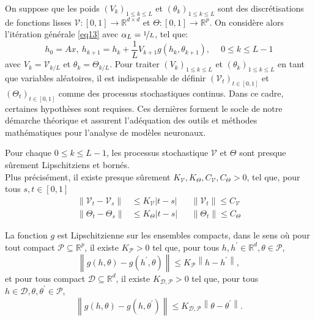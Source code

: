 On suppose que les poids $(V_k)_{1\leqslant k \leqslant L }$ et $(\theta_k)_{1\leqslant k \leqslant L }$ sont des discrétisations de fonctions lisses $\mathscr{V}:[0,1] \to \mathbb{R}^{d \times d}$ et $\Theta:[0,1] \to \mathbb{R}^{p}$. On considère alors l'itération générale \ref*{eq13} avec $\alpha_L = \nicefrac{1}{L}$, tel que:
\begin{equation}\label{eq13}
    h_0 = Ax,\ h_{k+1} = h_k + \frac{1}{L}V_{k+1}g(h_k,\theta_{k+1}),\quad \ 0 \leqslant k \leqslant L-1
\end{equation}
avec $V_k = \mathscr{V}_{k/L}$ et $\theta_k = \Theta_{k/L}$.
Pour traiter $(V_k)_{1\leqslant k \leqslant L}$ et $(\theta_k)_{1\leqslant k \leqslant L}$ en tant que variables aléatoires, il est indispensable de définir $(\mathscr{V}_t)_{t \in [0,1]}$ et $(\Theta_t)_{t \in [0,1]}$ comme des processus stochastiques continus. Dans ce cadre, certaines hypothèses sont requises. Ces dernières forment le socle de notre démarche théorique et assurent l'adéquation des outils et méthodes mathématiques pour l'analyse de modèles neuronaux.

\begin{assumption}\label{H5}
    Pour chaque $0 \leqslant k \leqslant L-1$, les processus stochastique $\mathscr{V}$ et $\Theta$ sont presque sûrement Lipschitziens et bornés. \\
    Plus précisément, il existe presque sûrement $K_{\mathscr{V}}, K_{\Theta}, C_{\mathscr{V}}, C_{\Theta}>0$, tel que, pour tous $s, t \in [0,1]$
    \begin{align*}
        \left\|\mathscr{V}_t-\mathscr{V}_s\right\| &\leqslant K_{\mathscr{V}}|t-s| 
        &&\left\|\mathscr{V}_t\right\| \leqslant C_{\mathscr{V}} \\
        \left\|\Theta_t-\Theta_s\right\| &\leqslant K_{\Theta}|t-s| 
        &&\left\|\Theta_t\right\| \leqslant C_{\Theta}
    \end{align*}
\end{assumption}

\begin{assumption}\label{H6}
La fonction $g$ est Lipschitzienne sur les ensembles compacts, dans le sens où pour tout compact $\mathscr{P} \subseteq \mathbb{R}^p$, il existe $K_{\mathscr{P}} > 0$  tel que, pour tous $h, h^{\prime} \in \mathbb{R}^d, \theta \in \mathscr{P}$,
$$
    \left\|g(h, \theta)-g\left(h^{\prime}, \theta\right)\right\| \leqslant K_{\mathscr{P}}\left\|h-h^{\prime}\right\|,
$$
et pour tous compact $\mathscr{D} \subseteq \mathbb{R}^d$, il existe $K_{\mathscr{D}, \mathscr{P}}>0$ tel que, pour tous $h \in \mathscr{D}, \theta, \theta^{\prime} \in \mathscr{P}$,
$$
    \left\|g(h, \theta)-g\left(h, \theta^{\prime}\right)\right\| \leqslant K_{\mathscr{D}, \mathscr{P}}\left\|\theta-\theta^{\prime}\right\| .
$$
\end{assumption}


